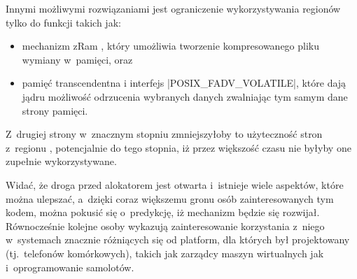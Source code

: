 Innymi możliwymi rozwiązaniami jest ograniczenie wykorzystywania
regionów  tylko do funkcji takich jak:

\begin{itemize}
\item mechanizm zRam \autocite{patch:zram}, który umożliwia tworzenie
  kompresowanego pliku wymiany w~pamięci, oraz
\item pamięć transcendentna \autocite{bib:transcendent} i interfejs
  \code|POSIX_FADV_VOLATILE|, które dają jądru możliwość odrzucenia
  wybranych danych zwalniając tym samym dane strony pamięci.
\end{itemize}

Z~drugiej strony w~znacznym stopniu zmniejszyłoby to użyteczność stron
z~regionu , potencjalnie do tego stopnia, iż przez większość czasu
nie byłyby one zupełnie wykorzystywane.

Widać, że droga przed alokatorem  jest otwarta i~istnieje wiele
aspektów, które można ulepszać, a~dzięki coraz większemu gronu osób
zainteresowanych tym kodem, można pokusić się o~predykcję, iż
mechanizm  będzie się rozwijał.  Równocześnie kolejne osoby
wykazują zainteresowanie korzystania z~niego w~systemach znacznie
różniących się od platform, dla których był projektowany
(tj.\ telefonów komórkowych), takich jak zarządcy maszyn wirtualnych
jak i~oprogramowanie samolotów.
